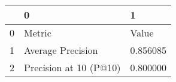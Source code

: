\begin{tabular}{lll}
\toprule
 & 0 & 1 \\
\midrule
0 & Metric & Value \\
1 & Average Precision & 0.856085 \\
2 & Precision at 10 (P@10) & 0.800000 \\
\bottomrule
\end{tabular}
